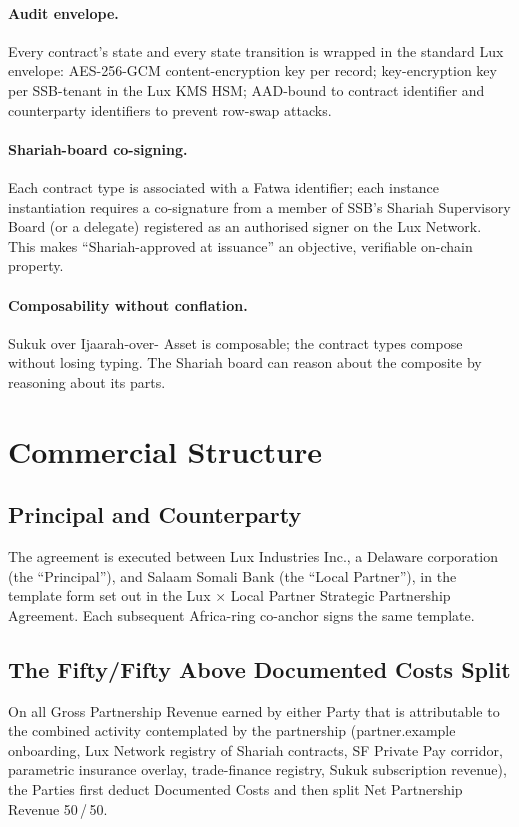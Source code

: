 \documentclass[11pt,letterpaper]{article}
\begin{document}
\paragraph{Audit envelope.} Every contract's state and every state
transition is wrapped in the standard Lux envelope: AES-256-GCM
content-encryption key per record; key-encryption key per
SSB-tenant in the Lux KMS HSM; AAD-bound to contract identifier and
counterparty identifiers to prevent row-swap attacks.

\paragraph{Shariah-board co-signing.} Each contract type is associated
with a Fatwa identifier; each instance instantiation requires a
co-signature from a member of SSB's Shariah Supervisory Board (or a
delegate) registered as an authorised signer on the Lux Network. This
makes ``Shariah-approved at issuance'' an objective, verifiable
on-chain property.

\paragraph{Composability without conflation.} Sukuk over Ijaarah-over-
Asset is composable; the contract types compose without losing
typing. The Shariah board can reason about the composite by reasoning
about its parts.

\section{Commercial Structure}

\subsection{Principal and Counterparty}
The agreement is executed between Lux Industries Inc., a Delaware
corporation (the ``Principal''), and Salaam Somali Bank (the
``Local Partner''), in the template form set out in the Lux × Local
Partner Strategic Partnership Agreement. Each subsequent Africa-ring
co-anchor signs the same template.

\subsection{The Fifty/Fifty Above Documented Costs Split}
On all Gross Partnership Revenue earned by either Party that is
attributable to the combined activity contemplated by the partnership
(partner.example onboarding, Lux Network registry of Shariah contracts,
SF Private Pay corridor, parametric insurance overlay, trade-finance
registry, Sukuk subscription revenue), the Parties first deduct
Documented Costs and then split Net Partnership Revenue 50\,/\,50.
\end{document}
